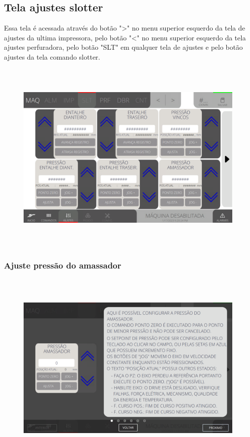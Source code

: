 \thispagestyle{fancy}
\vspace*{\fill}
\subsection{Tela ajustes slotter}
 Essa tela é acessada através do botão "\textgreater" no menu superior esquerdo da tela de ajustes da ultima impressora, pelo botão "\textless{}" no menu superior esquerdo 
 da tela ajustes perfuradora, pelo botão "SLT" em qualquer tela de ajustes e pelo botão ajustes da tela comando slotter.
\begin{figure}[h]
  \centering
  \includegraphics[width=576px,height=360px]{src/imagesFlexo/05-slotter/settings/e-Tela-Principal.png}
\end{figure}

\newpage
\thispagestyle{fancy}
\vspace*{\fill}
\subsubsection{\small{Ajuste pressão do amassador}}
\begin{figure}[h]
  \centering
  \includegraphics[width=576px,height=360px]{src/imagesFlexo/05-slotter/settings/e-1.png}
\end{figure}
\vspace*{\fill}

